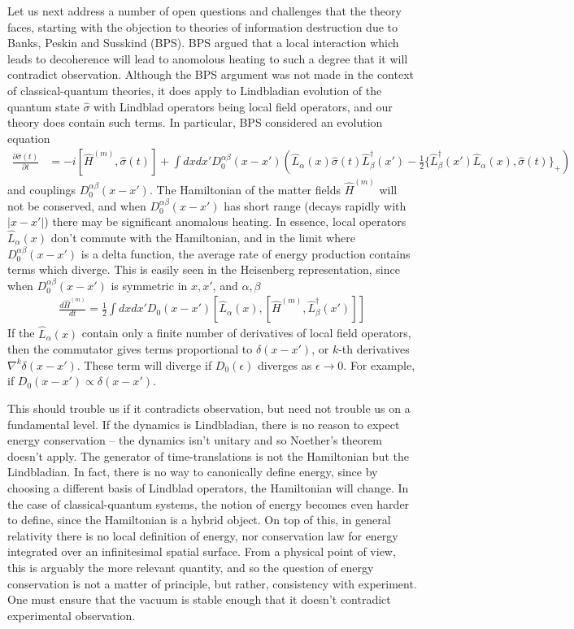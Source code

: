 \documentclass[aps,pra,showpacs,citeautoscript,amsmath,amssymb,floatfix,superscriptaddress,bbm, verbatim,amsfonts,changes,12pt,nofootinbib,longbibliography]{revtex4-2}
\def\L{{\hat{L}}}
\def\qmatterham{\hat{H}^{(m)}}
\def\ab{^{\alpha\beta}}
\def\lax{{\L_\alpha(x)}}
\def\lbxp{{\L^\dagger_\beta(x')}}
\begin{document}
Let us next address a number of open questions and challenges that the theory faces, starting with the objection to theories of information destruction due to Banks, Peskin and Susskind\label{par:bps} (BPS)\cite{bps}. BPS argued
that a local interaction which leads to decoherence will 
lead to anomolous heating to such a degree that it will contradict observation. Although the BPS argument was not made in the context of classical-quantum theories, it does apply to Lindbladian evolution of the quantum state $\hat{\sigma}$ with Lindblad operators being local field operators, and our theory does contain such terms. In particular, BPS considered an evolution equation
\begin{align}
\frac{\partial\hat{\sigma}(t)}{\partial t}
&=-i[\qmatterham,\hat{\sigma}(t)]
+ \int dxdx'
D_0\ab(x-x')\left( 
\L_{\alpha}(x)\hat{\sigma}(t)\L_{\beta}^\dagger(x')
-
\frac{1}{2}\{\lbxp\lax,\hat{\sigma}(t)\}_+ \right)  
\end{align}
 and couplings $D_0\ab(x-x')$.
The Hamiltonian of the matter fields $\qmatterham$ will not be conserved, and when $D_0\ab(x-x')$ has short range (decays rapidly with $|x-x'|$) there may be significant anomalous heating. In essence, local operators $\L_{\alpha}(x)$ don't commute with the Hamiltonian, and in the limit where $D_0\ab(x-x')$ is a delta function, the average rate of energy production contains terms which diverge. This is easily seen in the Heisenberg representation, since when $D_0\ab(x-x')$ is symmetric in $x,x'$, and $\alpha,\beta$ 
\begin{align}
\frac{d{\qmatterham}}{dt} =\frac{1}{2}\int dx dx' D_0(x-x')[\L_{\alpha}(x),[\qmatterham,\L^\dagger_\beta(x')]]
\label{eq:heating}
\end{align} 
If the $\L_{\alpha}(x)$ contain only a finite number of derivatives of local field operators, then the commutator gives terms proportional to $\delta(x-x')$, or $k$-th derivatives $\nabla^k\delta(x-x')$. These term will diverge if $D_0(\epsilon)$ diverges as $\epsilon\rightarrow 0$. For example, if $D_0(x-x')\propto \delta(x-x')$. 

This should trouble us if it contradicts observation, but need not trouble us on a fundamental level. If the dynamics is Lindbladian, there is no reason to expect energy conservation -- the dynamics isn't unitary and so Noether's theorem doesn't apply. The generator of time-translations is not the Hamiltonian but the Lindbladian\cite{Noether_foot}. In fact, there is no way to canonically define energy, since by choosing a different basis of Lindblad operators, the Hamiltonian will change.
In the case of classical-quantum systems, the notion of energy becomes even harder to  define, since the Hamiltonian is a hybrid object. 
On top of this, in general relativity there is no local definition of energy, nor conservation law for energy integrated over an infinitesimal spatial surface\cite{brown1992quasilocal}.  From a physical point of view, this is arguably the more relevant quantity, and so the question of energy conservation is not a matter of principle, but rather, consistency with experiment. 
One must ensure that the vacuum is stable enough that it doesn't contradict experimental observation.
\end{document}
